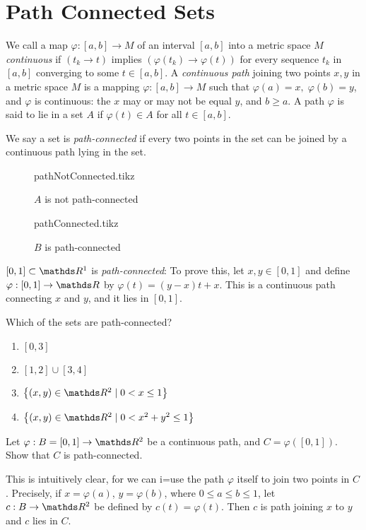 \documentclass[../main-sheet.tex]{subfiles}
\begin{document}
\section{Path Connected Sets}
\begin{defn}
    We call a map $ \varphi:[a,b]\to M $ of an interval $ [a,b] $ into a metric space $ M $ \emph{continuous} if $ (t_k\to t) $ implies $ \left( \varphi(t_k)\to \varphi(t)\right) $ for every sequence $ t_k $ in $ [a,b] $ converging to some $ t\in [a,b] $. A \emph{continuous path} joining two points $ x,y $ in a metric space $ M $ is a mapping $ \varphi:[a,b]\to M $ such that $ \varphi(a)=x, \;\varphi(b)=y $, and $ \varphi $ is continuous: the $ x $ may or may not be equal $ y $, and $ b\geq a $. A path $ \varphi$ is said to lie in a set $ A $ if $ \varphi(t)\in A $ for all $ t\in [a,b] $.

    We say a set is \emph{path-connected} if every two points in the set can be joined by a continuous path lying in the set.
\end{defn}
\begin{figure}[H]
    \centering
    \begin{minipage}{0.45\textwidth}
        \centering
        {pathNotConnected.tikz}
        \caption{$ A $ is not path-connected}
    \end{minipage}\hfill
    \begin{minipage}{0.45\textwidth}
        \centering
        {pathConnected.tikz}
        \caption{$ B $ is path-connected}
    \end{minipage}
\end{figure}
\begin{ex}
    $ [0,1]\subset \R^1 $ is \emph{path-connected}: To prove this, let $ x,y\in [0,1] $ and define $ \varphi:[0,1]\to \R $ by $ \varphi(t)=(y-x)t+x $. This is a continuous path connecting $ x $ and $ y $, and it lies in $ [0,1] $.
\end{ex}
\begin{ex}[H.W.]
    Which of the sets are path-connected?
    \begin{enumerate}[label=(\roman*)]
        \item $ [0,3] $
        \item $ [1,2]\cup [3,4] $
        \item $ \set{(x,y)\in\R^2\mid 0<x\leq 1} $
        \item $ \set{(x,y)\in\R^2\mid 0<x^2+y^2\leq 1} $
    \end{enumerate}
\end{ex}
\begin{ex}
    Let $ \varphi:B=[0,1]\to \R^2 $ be a continuous path, and $ C=\varphi([0,1]) $. Show that $ C $ is path-connected.
\end{ex}
\begin{soln}
    This is intuitively clear, for we can i=use the path $ \varphi $ itself to join two points in $ C $. Precisely, if $ x=\varphi(a) $, $ y=\varphi(b) $, where $  0\leq a\leq b\leq1  $, let $ c:B\to \R^2 $ be defined by $ c(t)=\varphi(t) $. Then $ c $ is path joining $ x $ to $ y $ and $ c $ lies in $ C $.
\end{soln}
\end{document}
